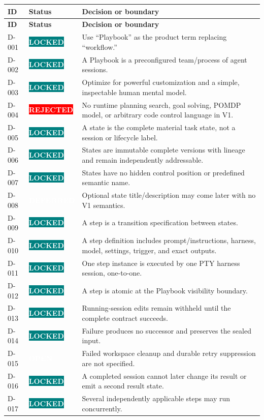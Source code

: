 \documentclass[11pt]{article}
\newcommand{\statuspill}[2]{%
  \begingroup\setlength{\fboxsep}{3pt}%
  \colorbox{#1}{\textcolor{white}{\sffamily\bfseries\scriptsize #2}}%
  \endgroup}
\newcommand{\Locked}{\statuspill{Teal}{LOCKED}}
\newcommand{\Open}{\statuspill{Amber}{OPEN}}
\newcommand{\Deferred}{\statuspill{Muted}{DEFERRED}}
\newcommand{\Rejected}{\statuspill{Red}{REJECTED}}
\begin{document}
\begin{longtable}{@{}L{0.52in}L{0.88in}L{5.10in}@{}}
\toprule
\textbf{ID} & \textbf{Status} & \textbf{Decision or boundary} \\
\midrule
\endfirsthead
\toprule
\textbf{ID} & \textbf{Status} & \textbf{Decision or boundary} \\
\midrule
\endhead
D-001 & \Locked & Use ``Playbook'' as the product term replacing ``workflow.'' \\
D-002 & \Locked & A Playbook is a preconfigured team/process of agent sessions. \\
D-003 & \Locked & Optimize for powerful customization and a simple, inspectable human mental model. \\
D-004 & \Rejected & No runtime planning search, goal solving, POMDP model, or arbitrary code control language in V1. \\
D-005 & \Locked & A state is the complete material task state, not a session or lifecycle label. \\
D-006 & \Locked & States are immutable complete versions with lineage and remain independently addressable. \\
D-007 & \Locked & States have no hidden control position or predefined semantic name. \\
D-008 & \Deferred & Optional state title/description may come later with no V1 semantics. \\
D-009 & \Locked & A step is a transition specification between states. \\
D-010 & \Locked & A step definition includes prompt/instructions, harness, model, settings, trigger, and exact outputs. \\
D-011 & \Locked & One step instance is executed by one PTY harness session, one-to-one. \\
D-012 & \Locked & A step is atomic at the Playbook visibility boundary. \\
D-013 & \Locked & Running-session edits remain withheld until the complete contract succeeds. \\
D-014 & \Locked & Failure produces no successor and preserves the sealed input. \\
D-015 & \Open & Failed workspace cleanup and durable retry suppression are not specified. \\
D-016 & \Locked & A completed session cannot later change its result or emit a second result state. \\
D-017 & \Locked & Several independently applicable steps may run concurrently. \\

\end{longtable}
\end{document}
